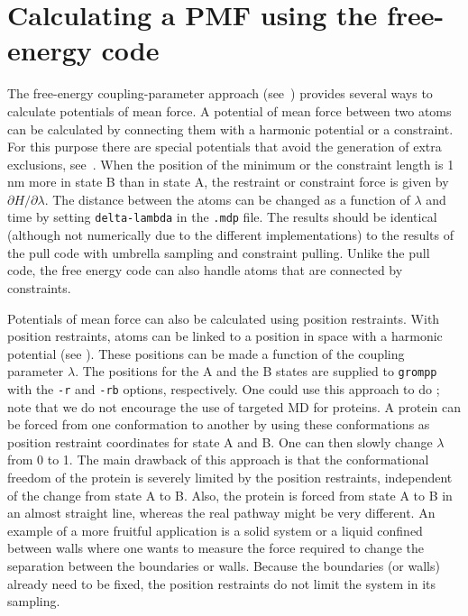 \section{Calculating a PMF using the free-energy code}
\label{sec:fepmf}
The free-energy coupling-parameter approach (see~)
provides several ways to calculate potentials of mean force.
A potential of mean force between two atoms can be calculated
by connecting them with a harmonic potential or a constraint.
For this purpose there are special potentials that avoid the generation of
extra exclusions, see~.
When the position of the minimum or the constraint length is 1 nm more
in state B than in state A, the restraint or constraint force is given
by $\partial H/\partial \lambda$.
The distance between the atoms can be changed as a function of $\lambda$
and time by setting {\tt delta-lambda} in the {\tt .mdp} file.
The results should be identical (although not numerically
due to the different implementations) to the results of the pull code
with umbrella sampling and constraint pulling.
Unlike the pull code, the free energy code can also handle atoms that
are connected by constraints.

Potentials of mean force can also be calculated using position restraints.
With position restraints, atoms can be linked to a position in space
with a harmonic potential (see ).
These positions can be made a function of the coupling parameter $\lambda$.
The positions for the A and the B states are supplied to {\tt grompp} with
the {\tt -r} and {\tt -rb} options, respectively.
One could use this approach to do ;
note that we do not encourage the use of targeted MD for proteins.
A protein can be forced from one conformation to another by using
these conformations as position restraint coordinates for state A and B.
One can then slowly change $\lambda$ from 0 to 1.
The main drawback of this approach is that the conformational freedom
of the protein is severely limited by the position restraints,
independent of the change from state A to B.
Also, the protein is forced from state A to B in an almost straight line,
whereas the real pathway might be very different.
An example of a more fruitful application is a solid system or a liquid
confined between walls where one wants to measure the force required
to change the separation between the boundaries or walls.
Because the boundaries (or walls) already need to be fixed,
the position restraints do not limit the system in its sampling.

